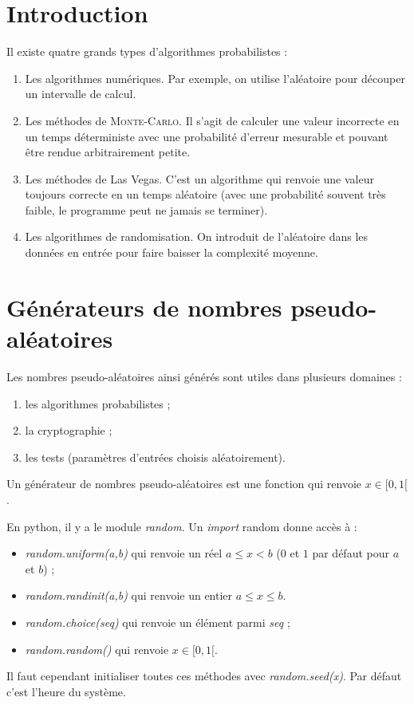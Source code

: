 \documentclass{mybourbaki}
\begin{document}
\section*{Introduction}

Il existe quatre grands types d'algorithmes probabilistes :
\begin{enumerate}
\item Les algorithmes numériques. Par exemple, on utilise l'aléatoire pour découper un intervalle de calcul.
\item Les méthodes de \textsc{Monte-Carlo}. Il s'agit de calculer une valeur incorrecte en un temps déterministe avec une probabilité d'erreur mesurable et pouvant être rendue arbitrairement petite.
\item Les méthodes de Las Vegas. C'est un algorithme qui renvoie une valeur toujours correcte en un temps aléatoire (avec une probabilité souvent très faible, le programme peut ne jamais se terminer).
\item Les algorithmes de randomisation. On introduit de l'aléatoire dans les données en entrée pour faire baisser la complexité moyenne.
\end{enumerate}

\section{Générateurs de nombres pseudo-aléatoires}

Les nombres pseudo-aléatoires ainsi générés sont utiles dans plusieurs domaines :
\begin{enumerate}
\item les algorithmes probabilistes ;
\item la cryptographie ;
\item les tests (paramètres d'entrées choisis aléatoirement).
\end{enumerate}


Un générateur de nombres pseudo-aléatoires est une fonction qui renvoie $x\in [0,1[$.

En python, il y a le module \textit{random}. Un \textit{import} random  donne accès à :
\begin{itemize}
\item \textit{random.uniform(a,b)} qui renvoie un réel $a\leq x < b$ ($0$ et $1$ par défaut pour $a$ et $b$) ;
\item \textit{random.randinit(a,b)} qui renvoie un entier $a \leq x \leq b$.
\item \textit{random.choice(seq)} qui renvoie un élément parmi \textit{seq} ;
\item \textit{random.random()} qui renvoie $x\in [0,1[$.
\end{itemize}
Il faut cependant initialiser toutes ces méthodes avec \textit{random.seed(x)}.  Par défaut c'est l'heure du système.
\end{document}
